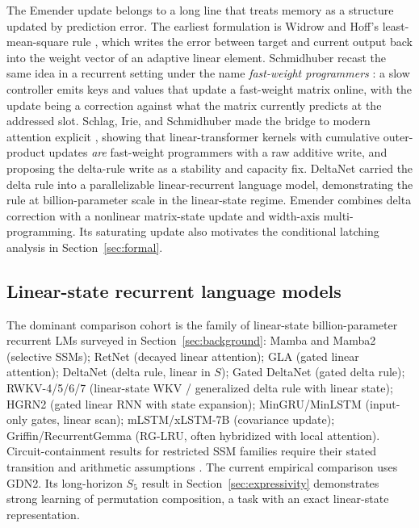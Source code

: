 \documentclass[10pt]{article}
\theoremstyle{canonical}
\theoremstyle{canonicalbullet}
\begin{document}
The Emender update belongs to a long line that treats memory as a structure updated by prediction error. The earliest formulation is Widrow and Hoff's least-mean-square rule \citep{widrow_hoff_1960}, which writes the error between target and current output back into the weight vector of an adaptive linear element. Schmidhuber recast the same idea in a recurrent setting under the name \emph{fast-weight programmers} \citep{schmidhuber_1992_fastweights}: a slow controller emits keys and values that update a fast-weight matrix online, with the update being a correction against what the matrix currently predicts at the addressed slot. Schlag, Irie, and Schmidhuber made the bridge to modern attention explicit \citep{schlag_irie_schmidhuber_2021}, showing that linear-transformer kernels with cumulative outer-product updates \emph{are} fast-weight programmers with a raw additive write, and proposing the delta-rule write as a stability and capacity fix. DeltaNet \citep{deltanet2024} carried the delta rule into a parallelizable linear-recurrent language model, demonstrating the rule at billion-parameter scale in the linear-state regime. Emender combines delta correction with a nonlinear matrix-state update and width-axis multi-programming. Its saturating update also motivates the conditional latching analysis in Section~\ref{sec:formal}.


\subsection*{Linear-state recurrent language models}


The dominant comparison cohort is the family of linear-state billion-parameter recurrent LMs surveyed in Section~\ref{sec:background}: Mamba \citep{mamba2024} and Mamba2 \citep{mamba2_2024} (selective SSMs); RetNet \citep{retnet2023} (decayed linear attention); GLA \citep{gla2023} (gated linear attention); DeltaNet \citep{deltanet2024} (delta rule, linear in $S $); Gated DeltaNet \citep{gated_deltanet2024} (gated delta rule); RWKV-4/5/6/7 \citep{rwkv4_2023} \citep{rwkv7_2025} (linear-state WKV / generalized delta rule with linear state); HGRN2 \citep{hgrn2_2024} (gated linear RNN with state expansion); MinGRU/MinLSTM \citep{mingru_2024} (input-only gates, linear scan); mLSTM/xLSTM-7B \citep{xlstm7b2025} (covariance update); Griffin/RecurrentGemma \citep{griffin2024} (RG-LRU, often hybridized with local attention). Circuit-containment results for restricted SSM families require their stated transition and arithmetic assumptions \citep{merrill2024transformers}. The current empirical comparison uses GDN2. Its long-horizon ${S }_{5}$ result in Section~\ref{sec:expressivity} demonstrates strong learning of permutation composition, a task with an exact linear-state representation.
\end{document}
